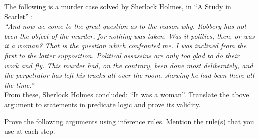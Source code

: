 \documentclass[addpoints]{exam}
\begin{document}
\begin{questions}
\question[10]
  The following is a murder case solved by Sherlock Holmes, in “A Study
  in Scarlet” :\\
  \textit{“And now we come to the great question as to the reason why. Robbery
    has not been the object of the murder, for nothing was taken. Was it
    politics, then, or was it a woman?  That is the question which confronted
    me. I was inclined from the first to the latter supposition. Political
    assassins are only too glad to do their work and fly. This murder had, on
    the contrary, been done most deliberately, and the perpetrator has left
    his tracks all over the room, showing he had been
    there all the time.”}\\
  From these, Sherlock Holmes concluded: ``It was a woman''.  Translate the
  above argument to statements in predicate logic and prove its validity.
  \begin{solution}
  \end{solution}

  
\question Prove the following arguments using inference rules. Mention the rule(s) that you use at each step.
\end{questions}
\end{document}
